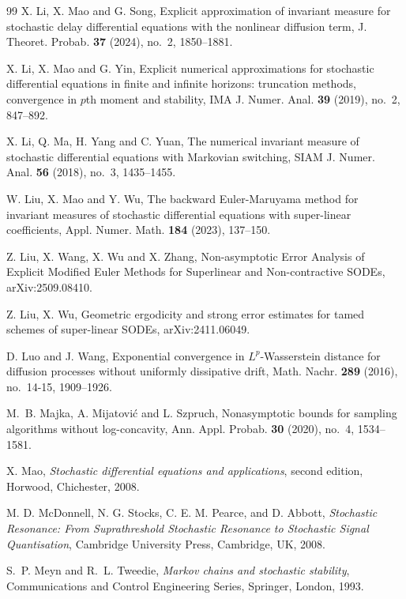 \documentclass[aap]{imsart}
\theoremstyle{plain}
\theoremstyle{definition}
\begin{document}
\begin{thebibliography}{99}
				\label{IM2} X. Li, X. Mao and G. Song, Explicit approximation of invariant measure for stochastic delay differential equations with the nonlinear diffusion term, J. Theoret. Probab. {\bf 37} (2024), no.~2, 1850--1881.
				
				\label{IMA} X. Li, X. Mao and G. Yin, Explicit numerical approximations for stochastic differential equations in finite and infinite horizons: truncation methods, convergence in $p$th moment and stability, IMA J. Numer. Anal. {\bf 39} (2019), no.~2, 847--892.
				
				\label{SIAM} X. Li, Q. Ma, H. Yang and C. Yuan, The numerical invariant measure of stochastic differential equations with Markovian switching, SIAM J. Numer. Anal. {\bf 56} (2018), no.~3, 1435--1455.
				
				\label{LiuW} W. Liu, X. Mao and Y. Wu, The backward Euler-Maruyama method for invariant measures of stochastic differential equations with super-linear coefficients, Appl. Numer. Math. {\bf 184} (2023), 137--150.
								
				\label{L.ZH} Z. Liu, X. Wang, X. Wu and X. Zhang, Non-asymptotic Error Analysis of Explicit Modified Euler Methods for Superlinear and Non-contractive SODEs, arXiv:2509.08410.
				
				\label{LiuWu}Z. Liu, X. Wu, Geometric ergodicity and strong error estimates for tamed schemes of super-linear SODEs, arXiv:2411.06049.
				
				\label{MN} D. Luo and J. Wang, Exponential convergence in $L^p$-Wasserstein distance for diffusion processes without uniformly dissipative drift, Math. Nachr. {\bf 289} (2016), no.~14-15, 1909--1926.
				
				\label{Majka} M.~B. Majka, A. Mijatovi\'c and L. Szpruch, Nonasymptotic bounds for sampling algorithms without log-concavity, Ann. Appl. Probab. {\bf 30} (2020), no.~4, 1534--1581.
				
				\label{Mao} X. Mao, {\it Stochastic differential equations and applications}, second edition, Horwood, Chichester, 2008.
				
				\label{McD} M. D. McDonnell, N. G. Stocks, C. E. M. Pearce, and D. Abbott, {\it Stochastic Resonance: From Suprathreshold Stochastic Resonance to Stochastic Signal Quantisation}, Cambridge University Press, Cambridge, UK, 2008.	
				
				\label{Meyn} S.~P. Meyn and R.~L. Tweedie, {\it Markov chains and stochastic stability}, Communications and Control Engineering Series, Springer, London, 1993.
				

\end{thebibliography}
\end{document}
